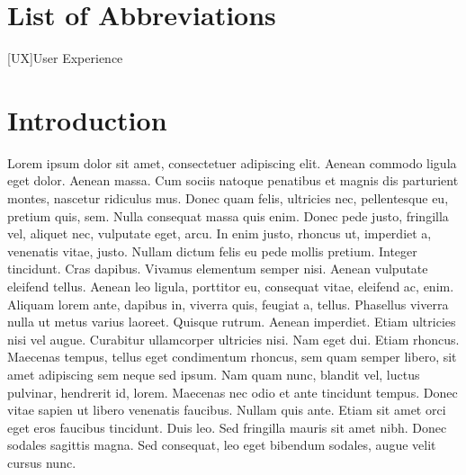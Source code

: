 \documentclass[11pt,a4paper]{scrreprt}
\begin{document}
\cleardoublepage
{}
{}
\listoftables


\chapter*{List of Abbreviations}


\begin{acronym}[UX] %
    [UX]{User Experience} %
\end{acronym}

\clearpage


\chapter{Introduction} \label{chap:introduction}

Lorem ipsum dolor sit amet, consectetuer adipiscing elit. Aenean commodo ligula eget dolor. Aenean massa. Cum sociis natoque penatibus et magnis dis parturient montes, nascetur ridiculus mus. Donec quam felis, ultricies nec, pellentesque eu, pretium quis, sem. Nulla consequat massa quis enim. Donec pede justo, fringilla vel, aliquet nec, vulputate eget, arcu. In enim justo, rhoncus ut, imperdiet a, venenatis vitae, justo. Nullam dictum felis eu pede mollis pretium. Integer tincidunt. Cras dapibus. Vivamus elementum semper nisi. Aenean vulputate eleifend tellus. Aenean leo ligula, porttitor eu, consequat vitae, eleifend ac, enim. Aliquam lorem ante, dapibus in, viverra quis, feugiat a, tellus. Phasellus viverra nulla ut metus varius laoreet. Quisque rutrum. Aenean imperdiet. Etiam ultricies nisi vel augue. Curabitur ullamcorper ultricies nisi. Nam eget dui. Etiam rhoncus. Maecenas tempus, tellus eget condimentum rhoncus, sem quam semper libero, sit amet adipiscing sem neque sed ipsum. Nam quam nunc, blandit vel, luctus pulvinar, hendrerit id, lorem. Maecenas nec odio et ante tincidunt tempus. Donec vitae sapien ut libero venenatis faucibus. Nullam quis ante. Etiam sit amet orci eget eros faucibus tincidunt. Duis leo. Sed fringilla mauris sit amet nibh. Donec sodales sagittis magna. Sed consequat, leo eget bibendum sodales, augue velit cursus nunc.
\end{document}

